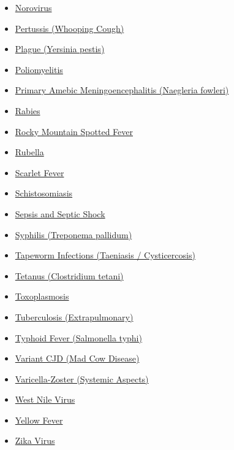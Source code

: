 \begin{itemize}[noitemsep]
  \item \hyperlink{sec:Norovirus}{Norovirus}
  \item \hyperlink{sec:Pertussis}{Pertussis (Whooping Cough)}
  \item \hyperlink{sec:Plague}{Plague (Yersinia pestis)}
  \item \hyperlink{sec:Poliomyelitis}{Poliomyelitis}
  \item \hyperlink{sec:Naegleria fowleri}{Primary Amebic Meningoencephalitis (Naegleria fowleri)}
  \item \hyperlink{sec:Rabies}{Rabies}
  \item \hyperlink{sec:Rocky Mountain Spotted Fever}{Rocky Mountain Spotted Fever}
  \item \hyperlink{sec:Rubella}{Rubella}
  \item \hyperlink{sec:Scarlet Fever}{Scarlet Fever}
  \item \hyperlink{sec:Schistosomiasis}{Schistosomiasis}
  \item \hyperlink{sec:Sepsis and Septic Shock}{Sepsis and Septic Shock}
  \item \hyperlink{sec:Syphilis}{Syphilis (Treponema pallidum)}
  \item \hyperlink{sec:Tapeworm Infections}{Tapeworm Infections (Taeniasis / Cysticercosis)}
  \item \hyperlink{sec:Tetanus}{Tetanus (Clostridium tetani)}
  \item \hyperlink{sec:Toxoplasmosis}{Toxoplasmosis}
  \item \hyperlink{sec:Tuberculosis (Extrapulmonary)}{Tuberculosis (Extrapulmonary)}
  \item \hyperlink{sec:Typhoid Fever}{Typhoid Fever (Salmonella typhi)}
  \item \hyperlink{sec:Variant CJD}{Variant CJD (Mad Cow Disease)}
  \item \hyperlink{sec:Varicella-Zoster Systemic}{Varicella-Zoster (Systemic Aspects)}
  \item \hyperlink{sec:West Nile Virus}{West Nile Virus}
  \item \hyperlink{sec:Yellow Fever}{Yellow Fever}
  \item \hyperlink{sec:Zika Virus}{Zika Virus}
\end{itemize}


